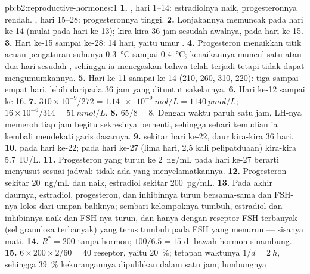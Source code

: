 \begin{solution}{pb:b2:reproductive-hormones:1}
\textbf{1.} , hari 1--14: estradiolnya naik, progesteronnya
rendah. , hari 15--28: progesteronnya tinggi.
\textbf{2.} Lonjakannya memuncak pada hari ke-14 (mulai pada hari
ke-13);  kira-kira 36 jam sesudah awalnya, pada hari ke-15.
\textbf{3.} Hari ke-15 sampai ke-28: 14 hari, yaitu umur .
\textbf{4.} Progesteron menaikkan titik acuan pengaturan suhunya
\qty{0.3}{\celsius} sampai \qty{0.4}{\celsius}; kenaikannya muncul satu
atau dua hari sesudah , sehingga ia menegaskan bahwa 
telah terjadi tetapi tidak dapat mengumumkannya.
\textbf{5.} Hari ke-11 sampai ke-14 (210, 260, 310, 220): tiga sampai
empat hari, lebih daripada 36 jam yang dituntut sakelarnya.
\textbf{6.} Hari ke-12 sampai ke-16.
\textbf{7.} $310\times 10^{-9}/272 = \qty{1.14e-9}{mol/L} =
\qty{1140}{pmol/L}$; $16\times 10^{-6}/314 = \qty{51}{nmol/L}$.
\textbf{8.} $65/8 = 8$. Dengan waktu paruh satu jam, LH-nya memeroh
tiap jam begitu sekresinya berhenti, sehingga sehari kemudian ia
kembali mendekati garis dasarnya.
\textbf{9.}  sekitar hari ke-22, daur kira-kira 36 hari.
\textbf{10.}  pada hari ke-22; pada hari ke-27 (lima hari,
2,5 kali pelipatduaan) kira-kira \qty{5.7}{IU/L}.
\textbf{11.} Progesteron yang turun ke \qty{2}{ng/mL} pada hari ke-27
berarti  menyusut sesuai jadwal: tidak ada yang
menyelamatkannya.
\textbf{12.} Progesteron sekitar \qty{20}{ng/mL} dan naik, estradiol
sekitar \qty{200}{pg/mL}.
\textbf{13.} Pada akhir daurnya, estradiol, progesteron, dan inhibinnya
turun bersama-sama dan FSH-nya lolos dari umpan baliknya; sembari
kelompoknya tumbuh, estradiol dan inhibinnya naik dan FSH-nya turun,
dan hanya  dengan reseptor FSH terbanyak (sel granulosa
terbanyak) yang terus tumbuh pada FSH yang menurun --- sisanya mati.
\textbf{14.} $R^* = 200$ tanpa hormon; $100/6.5 = 15$ di bawah hormon
sinambung.
\textbf{15.} $6\times 200\times 2/60 = 40$ reseptor, yaitu
\qty{20}{\%}; tetapan waktunya $1/d = \qty{2}{h}$, sehingga
\qty{39}{\%} kekurangannya dipulihkan dalam satu jam; lumbungnya

\end{solution}
